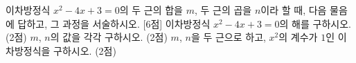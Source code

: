 이차방정식 $x^2-4x+3=0$의 두 근의 합을 $m$, 두 근의 곱을 $n$이라 할 때, 다음 물음에 답하고, 그 과정을 서술하시오. \mbox{[6점]}
 이차방정식 $x^2-4x+3=0$의 해를 구하시오. (2점)
 $m$, $n$의 값을 각각 구하시오. (2점)
 $m$, $n$을 두 근으로 하고, $x^2$의 계수가 $1$인 이차방정식을 구하시오. (2점)
